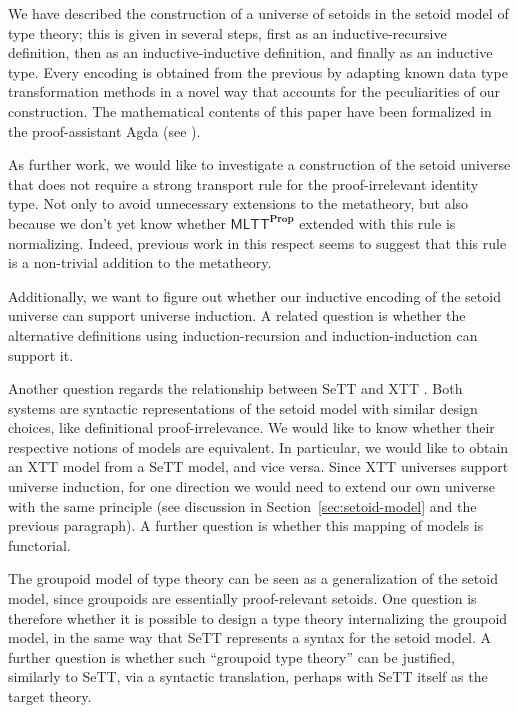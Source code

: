 \documentclass{easychair}
\newcommand{\mlttp}{\textsf{MLTT}^{\mProp}}
\newcommand{\mProp}{\mathbf{Prop}}
\begin{document}
We have described the construction of a universe of setoids in the setoid model
of type theory; this is given in several steps, first as an inductive-recursive
definition, then as an inductive-inductive definition, and finally as an
inductive type. Every encoding is obtained from the previous by adapting known
data type transformation methods in a novel way that accounts for the
peculiarities of our construction. The mathematical contents of this paper have
been formalized in the proof-assistant Agda (see \cite{agda-code}).

As further work, we would like to investigate a construction of the setoid
universe that does not require a strong transport rule for the proof-irrelevant
identity type. Not only to avoid unnecessary extensions to the metatheory, but
also because we don't yet know whether $\mlttp$ extended with this rule is
normalizing.
%
Indeed, previous work in this respect \cite{abel2019failure} seems to suggest
that this rule is a non-trivial addition to the metatheory.

Additionally, we want to figure out whether our inductive encoding of the setoid
universe can support universe induction. A related question is whether the
alternative definitions using induction-recursion and induction-induction can
support it.

Another question regards the relationship between SeTT \cite{mpc19} and XTT
\cite{xtt}. Both systems are syntactic representations of the setoid model with
similar design choices, like definitional proof-irrelevance. We would like to
know whether their respective notions of models are equivalent.
In particular, we would like to obtain an XTT model from a SeTT model, and vice versa. Since XTT
universes support universe induction, for one direction we would need to
extend our own universe with the same principle (see discussion in
Section~\ref{sec:setoid-model} and the previous paragraph). A further question is
whether this mapping of models is functorial.

The groupoid model of type theory \cite{groupoid} can be seen as a
generalization of the setoid model, since groupoids are essentially
proof-relevant setoids.
%
One question is therefore whether it is possible to design a type theory
internalizing the groupoid model, in the same way that SeTT represents a syntax
for the setoid model. A further question is whether such ``groupoid type
theory'' can be justified, similarly to SeTT, via a syntactic translation,
perhaps with SeTT itself as the target theory.



\end{document}
